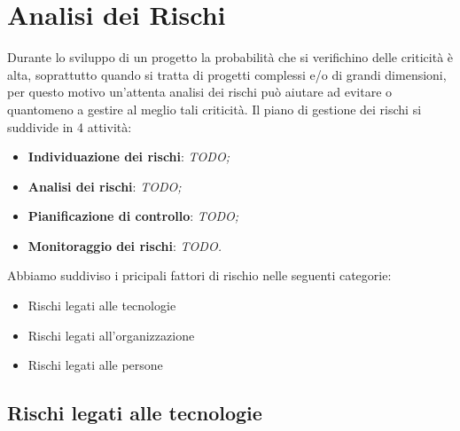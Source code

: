 \section{Analisi dei Rischi}
Durante lo sviluppo di un progetto la probabilità che si verifichino delle criticità è alta, 
soprattutto quando si tratta di progetti complessi e/o di grandi dimensioni, per questo motivo
un'attenta analisi dei rischi può aiutare ad evitare o quantomeno a gestire al meglio tali criticità.
Il piano di gestione dei rischi si suddivide in 4 attività:
\begin{itemize}
    \item \textbf{Individuazione dei rischi}: \textit{TODO;}
    \item \textbf{Analisi dei rischi}: \textit{TODO;}
    \item \textbf{Pianificazione di controllo}: \textit{TODO;}
    \item \textbf{Monitoraggio dei rischi}: \textit{TODO.}
\end{itemize}
Abbiamo suddiviso i pricipali fattori di rischio nelle seguenti categorie:
\begin{itemize}
    \item Rischi legati alle tecnologie
    \item Rischi legati all’organizzazione
    \item Rischi legati alle persone
\end{itemize}

\subsection{Rischi legati alle tecnologie}

